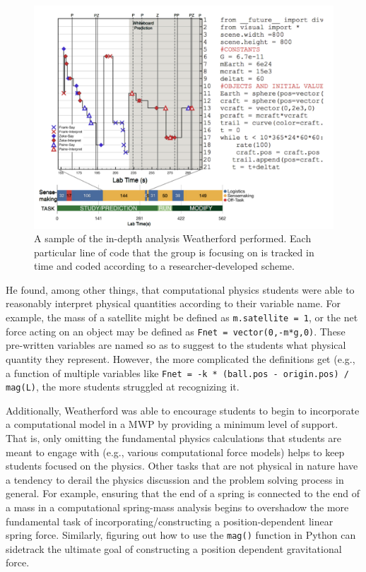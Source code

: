 \documentclass{msuphddissertation}
\begin{document}
\begin{doublespace}
\begin{figure}\center
\includegraphics[scale=0.60]{images/CH2Weatherford.pdf}
\caption{A sample of the in-depth analysis Weatherford performed.  Each particular line of code that the group is focusing on is tracked in time and coded according to a researcher-developed scheme.}\label{CH2:Weatherford}
\end{figure}

He found, among other things, that computational physics students were able to reasonably interpret physical quantities according to their variable name.  For example, the mass of a satellite might be defined as \texttt{m.satellite = 1}, or the net force acting on an object may be defined as \texttt{Fnet = vector(0,-m*g,0)}.  These pre-written variables are named so as to suggest to the students what physical quantity they represent.  However, the more complicated the definitions get (e.g., a function of multiple variables like \texttt{Fnet = -k * (ball.pos - origin.pos) / mag(L)}, the more students struggled at recognizing it.

Additionally, Weatherford was able to encourage students to begin to incorporate a computational model in a MWP by providing a minimum level of support.  That is, only omitting the fundamental physics calculations that students are meant to engage with (e.g., various computational force models) helps to keep students focused on the physics.  Other tasks that are not physical in nature have a tendency to derail the physics discussion and the problem solving process in general.  For example, ensuring that the end of a spring is connected to the end of a mass in a computational spring-mass analysis begins to overshadow the more fundamental task of incorporating/constructing a position-dependent linear spring force.  Similarly, figuring out how to use the \texttt{mag()} function in Python can sidetrack the ultimate goal of constructing a position dependent gravitational force.


\end{doublespace}
\end{document}
